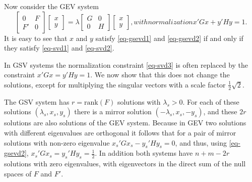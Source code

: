 \documentclass[
  12pt,
  letterpaper,
  DIV=11,
  numbers=noendperiod]{scrartcl}
\begin{document}
Now consider the GEV system \begin{subequations}
\begin{equation}
\begin{bmatrix}
0&F\\
F'&0
\end{bmatrix}
\begin{bmatrix}
x\\y
\end{bmatrix}
=\lambda
\begin{bmatrix}
G&0\\
0&H
\end{bmatrix}
\begin{bmatrix}
x\\y
\end{bmatrix}\label{eq-gsevd1},
\end{equation}
with normalization
\begin{equation}
x'Gx+y'Hy=1.
\end{equation}\label{eq-gsevd2}
\end{subequations} It is easy to see that \(x\) and \(y\) satisfy
\eqref{eq-gsevd1} and \eqref{eq-gsevd2} if and only if they satisfy
\eqref{eq-svd1} and \eqref{eq-svd2}.

In GSV systems the normalization constraint \eqref{eq-svd3} is often
replaced by the constraint \(x'Gx=y'Hy=1\). We now show that this does
not change the solutions, except for multiplying the singular vectors
with a scale factor \(\frac12\sqrt{2}\).

The GSV system has \(r=\text{rank}(F)\) solutions with \(\lambda_s>0\).
For each of these solutions \((\lambda_s,x_s,y_s)\) there is a mirror
solution \((-\lambda_s,x_s,-y_s)\), and these \(2r\) solutions are also
solutions of the GEV system. Because in GEV two solutions with different
eigenvalues are orthogonal it follows that for a pair of mirror
solutions with non-zero eigenvalue \(x_s'Gx_s-y_s'Hy_s=0\), and thus,
using \eqref{eq-gsevd2}, \(x_s'Gx_s=y_s'Hy_s=\frac12\). In addition both
systems have \(n+m-2r\) solutions with zero eigenvalues, with
eigenvectors in the direct sum of the null spaces of \(F\) and \(F'\).
\end{document}
